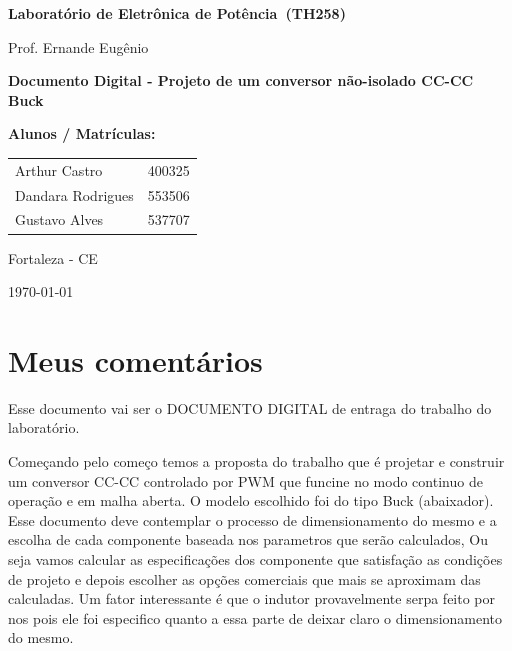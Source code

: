 \documentclass[12pt, a4paper]{article}
\newcommand{\disciplina}{Laboratório de Eletrônica de Potência}
\newcommand{\coddisciplina}{TH258}
\newcommand{\professor}{Prof. Ernande Eugênio}
\newcommand{\numpratica}{Documento Digital - Projeto de um conversor não-isolado CC-CC Buck}
\begin{document}
\begin{titlepage}
    \thispagestyle{fancy} %
    \centering
    \vspace*{1cm}
    
    {\Large \textbf{\disciplina\ (\coddisciplina)}\par}
    \vspace{0.3cm}
    {\large \professor\par}
    
    \vspace{2.5cm}
    
    {\LARGE \bfseries \numpratica\par}
    
    \vfill
    
    \begin{center}
        \textbf{Alunos / Matrículas:}\\[0.3cm]
        \begin{tabular}{ll}
            Arthur Castro & 400325 \\
            Dandara Rodrigues & 553506 \\
            Gustavo Alves & 537707
        \end{tabular}
    \end{center}
    
    \vfill
    
    {\large Fortaleza - CE\par}
    {\large \today\par}
\end{titlepage}

\clearpage
{}

\section{Meus comentários}

Esse documento vai ser o DOCUMENTO DIGITAL de entraga do trabalho do laboratório.

Começando pelo começo temos a proposta do trabalho que é projetar e construir um conversor CC-CC controlado por PWM que funcine no modo continuo de operação e em malha aberta.
O modelo escolhido foi do tipo Buck (abaixador).
Esse documento deve contemplar o processo de dimensionamento do mesmo e a escolha de cada componente baseada nos parametros que serão calculados, Ou seja vamos calcular as especificações dos componente que satisfação as condições de projeto e depois escolher as opções comerciais que mais se aproximam das calculadas.
Um fator interessante é que o indutor provavelmente serpa feito por nos pois ele foi especifico quanto a essa parte de deixar claro o dimensionamento do mesmo.
\end{document}
